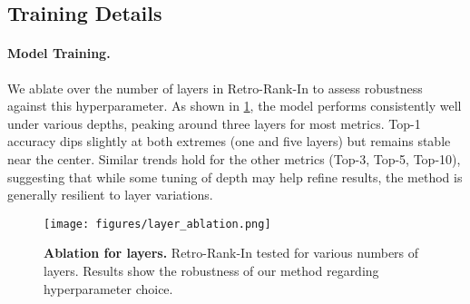 \subsection{Training Details}


\paragraph{Model Training.}
We ablate over the number of layers in Retro-Rank-In to assess robustness against this hyperparameter. As shown in \cref{fig:layers}, the model performs consistently well under various depths, peaking around three layers for most metrics. Top-1 accuracy dips slightly at both extremes (one and five layers) but remains stable near the center. Similar trends hold for the other metrics (Top-3, Top-5, Top-10), suggesting that while some tuning of depth may help refine results, the method is generally resilient to layer variations.

\begin{figure}[htb!]
    \label{figure_layer_ablation}
    \centering
        \centering
        \texttt{[image: figures/layer\_ablation.png]}
        \caption{\textbf{Ablation for layers.} Retro-Rank-In tested for various numbers of layers. Results show the robustness of our method regarding hyperparameter choice.}
        \label{fig:layers}
\end{figure}

